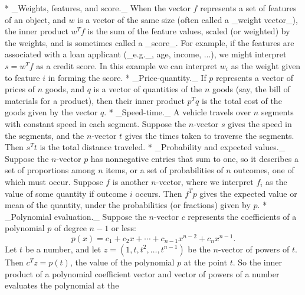 * _Weights, features, and score._ When the vector \(f\) represents a set of features of an object, and \(w\) is a vector of the same size (often called a _weight vector_), the inner product \(w^{T}f\) is the sum of the feature values, scaled (or weighted) by the weights, and is sometimes called a _score_. For example, if the features are associated with a loan applicant (_e.g._, age, income, ...), we might interpret \(s=w^{T}f\) as a credit score. In this example we can interpret \(w_{i}\) as the weight given to feature \(i\) in forming the score.
* _Price-quantity._ If \(p\) represents a vector of prices of \(n\) goods, and \(q\) is a vector of quantities of the \(n\) goods (say, the bill of materials for a product), then their inner product \(p^{T}q\) is the total cost of the goods given by the vector \(q\).
* _Speed-time._ A vehicle travels over \(n\) segments with constant speed in each segment. Suppose the \(n\)-vector \(s\) gives the speed in the segments, and the \(n\)-vector \(t\) gives the times taken to traverse the segments. Then \(s^{T}t\) is the total distance traveled.
* _Probability and expected values._ Suppose the \(n\)-vector \(p\) has nonnegative entries that sum to one, so it describes a set of proportions among \(n\) items, or a set of probabilities of \(n\) outcomes, one of which must occur. Suppose \(f\) is another \(n\)-vector, where we interpret \(f_{i}\) as the value of some quantity if outcome \(i\) occurs. Then \(f^{T}p\) gives the expected value or mean of the quantity, under the probabilities (or fractions) given by \(p\).
* _Polynomial evaluation._ Suppose the \(n\)-vector \(c\) represents the coefficients of a polynomial \(p\) of degree \(n-1\) or less: \[p(x)=c_{1}+c_{2}x+\cdots+c_{n-1}x^{n-2}+c_{n}x^{n-1}.\] Let \(t\) be a number, and let \(z=(1,t,t^{2},\ldots,t^{n-1})\) be the \(n\)-vector of powers of \(t\). Then \(c^{T}z=p(t)\), the value of the polynomial \(p\) at the point \(t\). So the inner product of a polynomial coefficient vector and vector of powers of a number evaluates the polynomial at the 